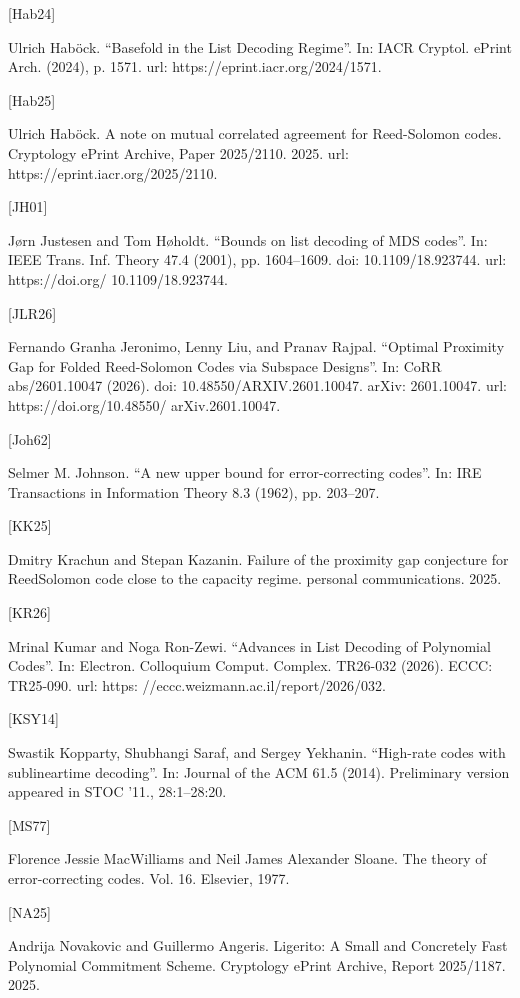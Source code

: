 \documentclass[11pt]{article}
\begin{document}
[Hab24]

Ulrich Haböck. “Basefold in the List Decoding Regime”. In: IACR Cryptol. ePrint Arch.
(2024), p. 1571. url: https://eprint.iacr.org/2024/1571.

[Hab25]

Ulrich Haböck. A note on mutual correlated agreement for Reed-Solomon codes. Cryptology
ePrint Archive, Paper 2025/2110. 2025. url: https://eprint.iacr.org/2025/2110.

[JH01]

Jørn Justesen and Tom Høholdt. “Bounds on list decoding of MDS codes”. In: IEEE Trans.
Inf. Theory 47.4 (2001), pp. 1604–1609. doi: 10.1109/18.923744. url: https://doi.org/
10.1109/18.923744.

[JLR26]

Fernando Granha Jeronimo, Lenny Liu, and Pranav Rajpal. “Optimal Proximity Gap for
Folded Reed-Solomon Codes via Subspace Designs”. In: CoRR abs/2601.10047 (2026). doi:
10.48550/ARXIV.2601.10047. arXiv: 2601.10047. url: https://doi.org/10.48550/
arXiv.2601.10047.

[Joh62]

Selmer M. Johnson. “A new upper bound for error-correcting codes”. In: IRE Transactions
in Information Theory 8.3 (1962), pp. 203–207.

[KK25]

Dmitry Krachun and Stepan Kazanin. Failure of the proximity gap conjecture for ReedSolomon code close to the capacity regime. personal communications. 2025.

[KR26]

Mrinal Kumar and Noga Ron-Zewi. “Advances in List Decoding of Polynomial Codes”. In:
Electron. Colloquium Comput. Complex. TR26-032 (2026). ECCC: TR25-090. url: https:
//eccc.weizmann.ac.il/report/2026/032.

[KSY14]

Swastik Kopparty, Shubhangi Saraf, and Sergey Yekhanin. “High-rate codes with sublineartime decoding”. In: Journal of the ACM 61.5 (2014). Preliminary version appeared in
STOC ’11., 28:1–28:20.

[MS77]

Florence Jessie MacWilliams and Neil James Alexander Sloane. The theory of error-correcting
codes. Vol. 16. Elsevier, 1977.

[NA25]

Andrija Novakovic and Guillermo Angeris. Ligerito: A Small and Concretely Fast Polynomial Commitment Scheme. Cryptology ePrint Archive, Report 2025/1187. 2025.
\end{document}
